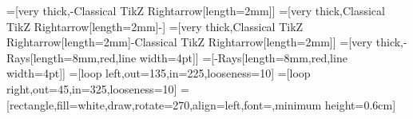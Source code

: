 \usepackage[utf8]{inputenc}
\usepackage[english]{babel}
\usepackage[hyphens]{url}
\usepackage{doi}
\usepackage{hyperref}
\usepackage{amsmath}
\usepackage{amssymb}
\usepackage{amsthm}
\usepackage{tikz}
\usepackage{tikzpeople} %
\usepackage{natbib}
\usepackage{fancyhdr} %
\usepackage{textcomp} %
\usepackage{algorithm}
\usepackage{algpseudocode} %
\usepackage{mdframed}

\usepackage{minted}

\usetikzlibrary{arrows.meta}
\usetikzlibrary{shapes.multipart}
\usetikzlibrary{shapes.callouts}
=[very thick,-{Classical TikZ Rightarrow[length=2mm]}]
=[very thick,{Classical TikZ Rightarrow[length=2mm]}-]
=[very thick,{Classical TikZ Rightarrow[length=2mm]}-{Classical TikZ Rightarrow[length=2mm]}]
=[very thick,-{Rays[length=8mm,red,line width=4pt]}]
=[-{Rays[length=8mm,red,line width=4pt]}]
=[loop left,out=135,in=225,looseness=10]
=[loop right,out=45,in=325,looseness=10]
=[rectangle,fill=white,draw,rotate=270,align=left,font=\footnotesize,minimum height=0.6cm]


\newcommand{\inlineslide}[2]{
    \refstepcounter{inlineslides}
    \pagebreak[3]\vspace{1em}\noindent
    \fbox{
      \begin{minipage}{9cm}
        \begin{center}
          \includeslide[width=9cm,page=0]{#1} \\
        \end{center}
      \end{minipage}
    }
    \hfill
    \begin{minipage}{6cm}
        \vbox to 5.5cm {\raggedright{#2}\vfil}%
        \vspace{1cm}%
        \textsf{Slide \theinlineslides}%
    \end{minipage}
    \par\vspace{1em}\pagebreak[3]
}
\def\inlineslidesautorefname{Slide}%

